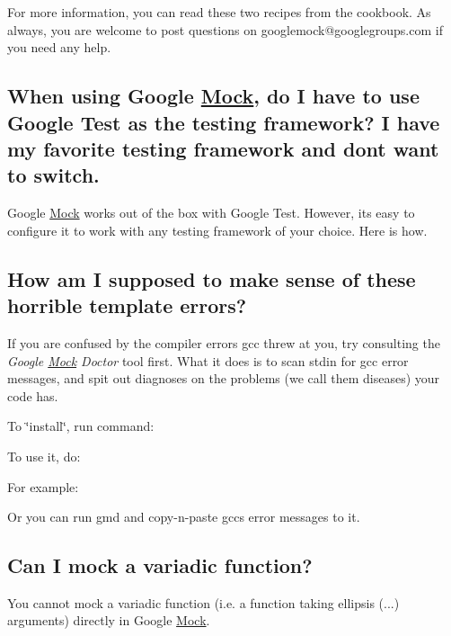 For more information, you can read these two recipes from the cookbook. As always, you are welcome to post questions on {\ttfamily googlemock@googlegroups.\+com} if you need any help.

\subsection*{When using Google \mbox{\hyperlink{class_mock}{Mock}}, do I have to use Google Test as the testing framework? I have my favorite testing framework and don\textquotesingle{}t want to switch.}

Google \mbox{\hyperlink{class_mock}{Mock}} works out of the box with Google Test. However, it\textquotesingle{}s easy to configure it to work with any testing framework of your choice. Here is how.

\subsection*{How am I supposed to make sense of these horrible template errors?}

If you are confused by the compiler errors gcc threw at you, try consulting the {\itshape Google \mbox{\hyperlink{class_mock}{Mock}} Doctor} tool first. What it does is to scan stdin for gcc error messages, and spit out diagnoses on the problems (we call them diseases) your code has.

To \char`\"{}install\char`\"{}, run command\+: 
\begin{DoxyCode}{0}
\end{DoxyCode}


To use it, do\+: 
\begin{DoxyCode}{0}
\end{DoxyCode}


For example\+: 
\begin{DoxyCode}{0}
\end{DoxyCode}


Or you can run {\ttfamily gmd} and copy-\/n-\/paste gcc\textquotesingle{}s error messages to it.

\subsection*{Can I mock a variadic function?}

You cannot mock a variadic function (i.\+e. a function taking ellipsis ({\ttfamily ...}) arguments) directly in Google \mbox{\hyperlink{class_mock}{Mock}}.

